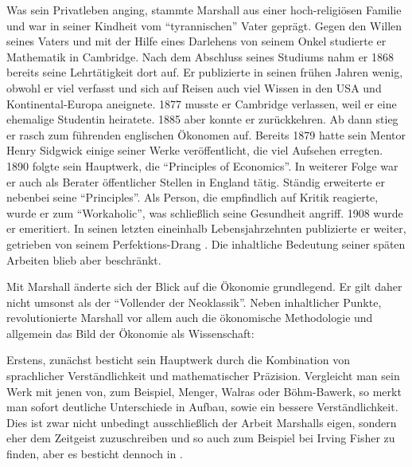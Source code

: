Was sein Privatleben anging, stammte Marshall aus einer hoch-religiösen Familie und war in seiner Kindheit vom "`tyrannischen"' Vater \parencite[S. 313]{Keynes1924} geprägt. Gegen den Willen seines Vaters und mit der Hilfe eines Darlehens von seinem Onkel studierte er Mathematik in Cambridge. Nach dem Abschluss seines Studiums nahm er 1868 bereits seine Lehrtätigkeit dort auf. Er publizierte in seinen frühen Jahren wenig, obwohl er viel verfasst und sich auf Reisen auch viel Wissen in den USA und Kontinental-Europa aneignete. 1877 musste er Cambridge verlassen, weil er eine ehemalige Studentin heiratete. 1885 aber konnte er zurückkehren. Ab dann stieg er rasch zum führenden englischen Ökonomen auf. Bereits 1879 hatte sein Mentor Henry Sidgwick einige seiner Werke veröffentlicht, die viel Aufsehen erregten. 1890 folgte sein Hauptwerk, die "`Principles of Economics"'. In weiterer Folge war er auch als Berater öffentlicher Stellen in England tätig. Ständig erweiterte er nebenbei seine "`Principles"'. Als Person, die empfindlich auf Kritik reagierte, wurde er zum "`Workaholic"', was schließlich seine Gesundheit angriff. 1908 wurde er emeritiert. In seinen letzten eineinhalb Lebensjahrzehnten publizierte er weiter, getrieben von seinem Perfektions-Drang \parencite[S. 145f]{Rieter1989}. Die inhaltliche Bedeutung seiner späten Arbeiten blieb aber beschränkt.

Mit Marshall änderte sich der Blick auf die Ökonomie grundlegend. Er gilt daher nicht umsonst als der "`Vollender der Neoklassik"'. Neben inhaltlicher Punkte, revolutionierte Marshall vor allem auch die ökonomische Methodologie und allgemein das Bild der Ökonomie als Wissenschaft:

Erstens, zunächst besticht sein Hauptwerk durch die Kombination von sprachlicher Verständlichkeit und mathematischer Präzision. Vergleicht man sein Werk mit jenen von, zum Beispiel, Menger, Walras oder Böhm-Bawerk, so merkt man sofort deutliche Unterschiede in Aufbau, sowie ein bessere Verständlichkeit. Dies ist zwar nicht unbedingt ausschließlich der Arbeit Marshalls eigen, sondern eher dem Zeitgeist zuzuschreiben und so auch zum Beispiel bei Irving Fisher zu finden, aber es besticht dennoch in \textcite{Marshall1890}. 

